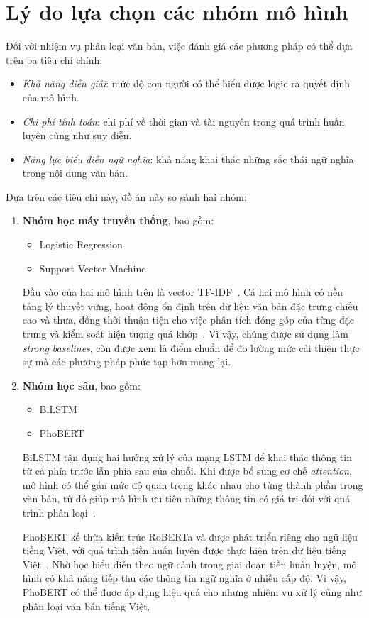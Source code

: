 \section{Lý do lựa chọn các nhóm mô hình}
\label{sec:model_selection}

Đối với nhiệm vụ phân loại văn bản,  việc đánh giá các phương pháp có thể dựa trên ba tiêu chí chính:
\begin{itemize}
    \item \textit{Khả năng diễn giải}: mức độ con người có thể hiểu được logic ra quyết định của mô hình.
    \item \textit{Chi phí tính toán}: chi phí về thời gian và tài nguyên trong quá trình huấn luyện cũng như suy diễn.
    \item \textit{Năng lực biểu diễn ngữ nghĩa}: khả năng khai thác những sắc thái ngữ nghĩa trong nội dung văn bản.
\end{itemize}

Dựa trên các tiêu chí này, đồ án này so sánh hai nhóm:
\begin{enumerate}
    \item \textbf{Nhóm học máy truyền thống}, bao gồm:
    \begin{itemize}
        \item Logistic Regression
        \item Support Vector Machine
    \end{itemize}
    Đầu vào của hai mô hình trên là vector TF-IDF~\cite{sparkjones1972idf}. Cả hai mô hình có nền tảng lý thuyết vững, hoạt động ổn định trên dữ liệu văn bản đặc trưng chiều cao và thưa, đồng thời thuận tiện cho việc phân tích đóng góp của từng đặc trưng và kiểm soát hiện tượng quá khớp~\cite{cortes1995svm}. Vì vậy, chúng được sử dụng làm \textit{strong baselines}, còn được xem là điểm chuẩn để đo lường mức cải thiện thực sự mà các phương pháp phức tạp hơn mang lại.

    \item \textbf{Nhóm học sâu}, bao gồm:
    \begin{itemize}
        \item BiLSTM
        \item PhoBERT
    \end{itemize}
    BiLSTM tận dụng hai hướng xử lý của mạng LSTM để khai thác thông tin từ cả phía trước lẫn phía sau của chuỗi. Khi được bổ sung cơ chế \textit{attention}, mô hình có thể gán mức độ quan trọng khác nhau cho từng thành phần trong văn bản, từ đó giúp mô hình ưu tiên những thông tin có giá trị đối với quá trình phân loại~\cite{hochreiter1997lstm,bahdanau2015attention}.

    PhoBERT kế thừa kiến trúc RoBERTa và được phát triển riêng cho ngữ liệu tiếng Việt, với quá trình tiền huấn luyện được thực hiện trên dữ liệu tiếng Việt~\cite{vaswani2017attention,liu2019roberta,phobert2020}. Nhờ học biểu diễn theo ngữ cảnh trong giai đoạn tiền huấn luyện, mô hình có khả năng tiếp thu các thông tin ngữ nghĩa ở nhiều cấp độ. Vì vậy, PhoBERT có thể được áp dụng hiệu quả cho những nhiệm vụ xử lý cũng như phân loại văn bản tiếng Việt.
\end{enumerate}

